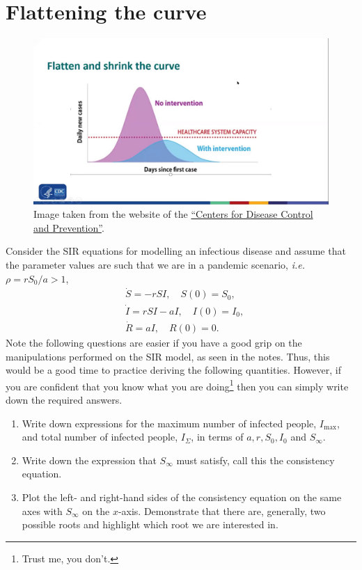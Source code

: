 \documentclass[10pt]{article}
\newcommand{\ie}{\emph{i.e.} }
\newcommand{\tp}{.8\textwidth}
\newcounter{Counter1}
\begin{document}
\section{Flattening the curve}\label{Flattening the curve}
\begin{figure}[h!!!tb]
\centering
\includegraphics[width=\tp]{../../Pictures/CDC_image.jpg}
\caption{Image taken from the website of the \href{https://www.cdc.gov/hiv/covid-19/index.html}{``Centers for Disease Control and Prevention''}. \label{CDC}}
\end{figure}
Consider the SIR equations for modelling an infectious disease and assume that the parameter values are such that we are in a pandemic scenario, \ie $\rho=rS_0/a>1$,
\begin{align}
&\dot{S}=-rSI, \quad S(0)=S_0,\\
&\dot{I}=rSI-aI,\quad I(0)=I_0,\\
&\dot{R}=aI, \quad R(0)=0.
\end{align}
Note the following questions are easier if you have a good grip on the manipulations performed on the SIR model, as seen in the notes. Thus, this would be a good time to practice deriving the following quantities. However, if you are confident that you know what you are doing\footnote{Trust me, you don't.} then you can simply write down the required answers.
\begin{enumerate}
\item Write down expressions for the maximum number of infected people, $I_{\textrm{max}}$, and total number of infected people, $I_\Sigma$, in terms of $a, r, S_0, I_0$ and $S_\infty$.

\item Write down the expression that $S_\infty$ must satisfy, call this the consistency equation.

\item Plot the left- and right-hand sides of the consistency equation on the same axes with $S_\infty$ on the $x$-axis. Demonstrate that there are, generally, two possible roots and highlight which root we are interested in.\label{Graphical_question}
\setcounter{Counter1}{\value{enumi}}
\end{enumerate}
\end{document}
